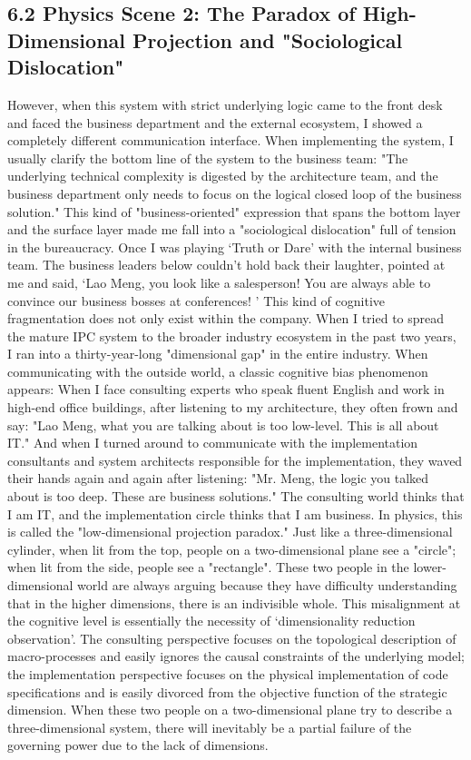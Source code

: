 \documentclass[11pt,a4paper]{article}
\begin{document}
\subsection*{6.2 Physics Scene 2: The Paradox of High-Dimensional Projection and "Sociological Dislocation"}


However, when this system with strict underlying logic came to the front desk and faced the business department and the external ecosystem, I showed a completely different communication interface. When implementing the system, I usually clarify the bottom line of the system to the business team: "The underlying technical complexity is digested by the architecture team, and the business department only needs to focus on the logical closed loop of the business solution." This kind of "business-oriented" expression that spans the bottom layer and the surface layer made me fall into a "sociological dislocation" full of tension in the bureaucracy. Once I was playing ‘Truth or Dare’ with the internal business team. The business leaders below couldn’t hold back their laughter, pointed at me and said, ‘Lao Meng, you look like a salesperson! You are always able to convince our business bosses at conferences! ’ This kind of cognitive fragmentation does not only exist within the company. When I tried to spread the mature IPC system to the broader industry ecosystem in the past two years, I ran into a thirty-year-long "dimensional gap" in the entire industry. When communicating with the outside world, a classic cognitive bias phenomenon appears: When I face consulting experts who speak fluent English and work in high-end office buildings, after listening to my architecture, they often frown and say: "Lao Meng, what you are talking about is too low-level. This is all about IT." And when I turned around to communicate with the implementation consultants and system architects responsible for the implementation, they waved their hands again and again after listening: "Mr. Meng, the logic you talked about is too deep. These are business solutions." The consulting world thinks that I am IT, and the implementation circle thinks that I am business. In physics, this is called the "low-dimensional projection paradox." Just like a three-dimensional cylinder, when lit from the top, people on a two-dimensional plane see a "circle"; when lit from the side, people see a "rectangle". These two people in the lower-dimensional world are always arguing because they have difficulty understanding that in the higher dimensions, there is an indivisible whole. This misalignment at the cognitive level is essentially the necessity of ‘dimensionality reduction observation’. The consulting perspective focuses on the topological description of macro-processes and easily ignores the causal constraints of the underlying model; the implementation perspective focuses on the physical implementation of code specifications and is easily divorced from the objective function of the strategic dimension. When these two people on a two-dimensional plane try to describe a three-dimensional system, there will inevitably be a partial failure of the governing power due to the lack of dimensions.
\end{document}
